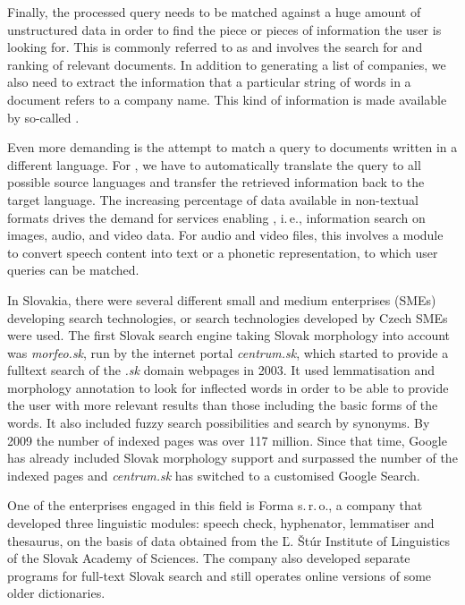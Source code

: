 \begin{multicols}{2}
Finally, the processed query needs to be matched against a huge amount of unstructured data in order to find the piece or pieces of information the user is looking for. This is commonly referred to as  and involves the search for and ranking of relevant documents. In addition to generating a list of companies, we also need to extract the information that a particular string of words in a document refers to a company name. This kind of information is made available by so-called . 

Even more demanding is the attempt to match a query to documents written in a different language. For , we have to automatically translate the query to all possible source languages and transfer the retrieved information back to the target language. The increasing percentage of data available in non-textual formats drives the demand for services enabling , i.\,e., information search on images, audio, and video data. For audio and video files, this involves a  module to convert speech content into text or a phonetic representation, to which user queries can be matched.

In Slovakia, there were several different small and medium enterprises (SMEs) developing search technologies, or search technologies developed by Czech SMEs were used. The first Slovak search engine taking Slovak morphology\cite{f24} into account was \emph{morfeo.sk}, run by the internet portal \emph{centrum.sk}, which started to provide a fulltext search of the \emph{.sk} domain webpages in 2003. It used lemmatisation and morphology annotation to look for inflected words in order to be able to provide the user with more relevant results than those including the basic forms of the words. It also included fuzzy search possibilities and search by synonyms. By 2009 the number of indexed pages was over 117 million. Since that time, Google has already included Slovak morphology support and surpassed the number of the indexed pages and \emph{centrum.sk} has switched to a customised Google Search.

One of the enterprises engaged in this field is Forma s.\,r.\,o.\cite{f25}, a company that developed three linguistic modules: speech check, hyphenator, lemmatiser and thesaurus, on the basis of data obtained from the Ľ. Štúr Institute of Linguistics of the Slovak Academy of Sciences. The company also developed separate programs for full-text Slovak search and still operates online versions of some older dictionaries. 


\end{multicols}
